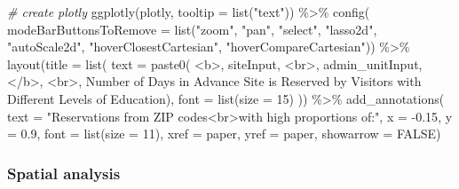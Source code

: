 \documentclass[
  11 pt,
  openany]{book}
\newenvironment{Shaded}{\begin{snugshade}}{\end{snugshade}}
\newcommand{\AttributeTok}[1]{\textcolor[rgb]{0.77,0.63,0.00}{#1}}
\newcommand{\CommentTok}[1]{\textcolor[rgb]{0.56,0.35,0.01}{\textit{#1}}}
\newcommand{\ConstantTok}[1]{\textcolor[rgb]{0.00,0.00,0.00}{#1}}
\newcommand{\DecValTok}[1]{\textcolor[rgb]{0.00,0.00,0.81}{#1}}
\newcommand{\FloatTok}[1]{\textcolor[rgb]{0.00,0.00,0.81}{#1}}
\newcommand{\FunctionTok}[1]{\textcolor[rgb]{0.00,0.00,0.00}{#1}}
\newcommand{\NormalTok}[1]{#1}
\newcommand{\SpecialCharTok}[1]{\textcolor[rgb]{0.00,0.00,0.00}{#1}}
\newcommand{\StringTok}[1]{\textcolor[rgb]{0.31,0.60,0.02}{#1}}
\begin{document}
\begin{Shaded}
\begin{Highlighting}[]
\CommentTok{\# create plotly}
\FunctionTok{ggplotly}\NormalTok{(plotly,}
         \AttributeTok{tooltip =} \FunctionTok{list}\NormalTok{(}\StringTok{"text"}\NormalTok{)) }\SpecialCharTok{\%\textgreater{}\%}
  \FunctionTok{config}\NormalTok{(}
    \AttributeTok{modeBarButtonsToRemove =} \FunctionTok{list}\NormalTok{(}\StringTok{"zoom"}\NormalTok{, }\StringTok{"pan"}\NormalTok{, }\StringTok{"select"}\NormalTok{, }\StringTok{"lasso2d"}\NormalTok{, }\StringTok{"autoScale2d"}\NormalTok{,}
                                  \StringTok{"hoverClosestCartesian"}\NormalTok{, }\StringTok{"hoverCompareCartesian"}\NormalTok{)) }\SpecialCharTok{\%\textgreater{}\%}
  \FunctionTok{layout}\NormalTok{(}\AttributeTok{title =} \FunctionTok{list}\NormalTok{(}
    \AttributeTok{text =} \FunctionTok{paste0}\NormalTok{( }\StringTok{\textquotesingle{}\textless{}b\textgreater{}\textquotesingle{}}\NormalTok{, siteInput, }\StringTok{\textquotesingle{}\textless{}br\textgreater{}\textquotesingle{}}\NormalTok{, admin\_unitInput, }\StringTok{\textquotesingle{}\textless{}/b\textgreater{}\textquotesingle{}}\NormalTok{, }\StringTok{\textquotesingle{}\textless{}br\textgreater{}\textquotesingle{}}\NormalTok{,}
                   \StringTok{\textquotesingle{}Number of Days in Advance Site is Reserved by Visitors with Different Levels of Education\textquotesingle{}}\NormalTok{),}
    \AttributeTok{font =} \FunctionTok{list}\NormalTok{(}\AttributeTok{size =} \DecValTok{15}\NormalTok{) )) }\SpecialCharTok{\%\textgreater{}\%}
  \FunctionTok{add\_annotations}\NormalTok{(}
    \AttributeTok{text =} \StringTok{"Reservations from ZIP codes\textless{}br\textgreater{}with high proportions of:"}\NormalTok{,}
    \AttributeTok{x =} \SpecialCharTok{{-}}\FloatTok{0.15}\NormalTok{, }\AttributeTok{y =} \FloatTok{0.9}\NormalTok{, }
    \AttributeTok{font =} \FunctionTok{list}\NormalTok{(}\AttributeTok{size =} \DecValTok{11}\NormalTok{),}
    \AttributeTok{xref =} \StringTok{\textquotesingle{}paper\textquotesingle{}}\NormalTok{, }\AttributeTok{yref =} \StringTok{\textquotesingle{}paper\textquotesingle{}}\NormalTok{, }
    \AttributeTok{showarrow =} \ConstantTok{FALSE}\NormalTok{)}
\end{Highlighting}
\end{Shaded}

\hypertarget{spatial-analysis}{%
\subsubsection{Spatial analysis}\label{spatial-analysis}}
\end{document}
